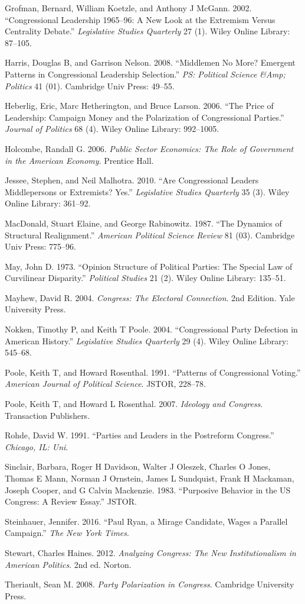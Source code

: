 \documentclass[12pt,twoside]{reedthesis}
\begin{document}
  Grofman, Bernard, William Koetzle, and Anthony J McGann. 2002.
  ``Congressional Leadership 1965--96: A New Look at the Extremism Versus
  Centrality Debate.'' \emph{Legislative Studies Quarterly} 27 (1). Wiley
  Online Library: 87--105.
  
  Harris, Douglas B, and Garrison Nelson. 2008. ``Middlemen No More?
  Emergent Patterns in Congressional Leadership Selection.'' \emph{PS:
  Political Science \&Amp; Politics} 41 (01). Cambridge Univ Press:
  49--55.
  
  Heberlig, Eric, Marc Hetherington, and Bruce Larson. 2006. ``The Price
  of Leadership: Campaign Money and the Polarization of Congressional
  Parties.'' \emph{Journal of Politics} 68 (4). Wiley Online Library:
  992--1005.
  
  Holcombe, Randall G. 2006. \emph{Public Sector Economics: The Role of
  Government in the American Economy}. Prentice Hall.
  
  Jessee, Stephen, and Neil Malhotra. 2010. ``Are Congressional Leaders
  Middlepersons or Extremists? Yes.'' \emph{Legislative Studies Quarterly}
  35 (3). Wiley Online Library: 361--92.
  
  MacDonald, Stuart Elaine, and George Rabinowitz. 1987. ``The Dynamics of
  Structural Realignment.'' \emph{American Political Science Review} 81
  (03). Cambridge Univ Press: 775--96.
  
  May, John D. 1973. ``Opinion Structure of Political Parties: The Special
  Law of Curvilinear Disparity.'' \emph{Political Studies} 21 (2). Wiley
  Online Library: 135--51.
  
  Mayhew, David R. 2004. \emph{Congress: The Electoral Connection}. 2nd
  Edition. Yale University Press.
  
  Nokken, Timothy P, and Keith T Poole. 2004. ``Congressional Party
  Defection in American History.'' \emph{Legislative Studies Quarterly} 29
  (4). Wiley Online Library: 545--68.
  
  Poole, Keith T, and Howard Rosenthal. 1991. ``Patterns of Congressional
  Voting.'' \emph{American Journal of Political Science}. JSTOR, 228--78.
  
  Poole, Keith T, and Howard L Rosenthal. 2007. \emph{Ideology and
  Congress}. Transaction Publishers.
  
  Rohde, David W. 1991. ``Parties and Leaders in the Postreform
  Congress.'' \emph{Chicago, IL: Uni}.
  
  Sinclair, Barbara, Roger H Davidson, Walter J Oleszek, Charles O Jones,
  Thomas E Mann, Norman J Ornstein, James L Sundquist, Frank H Mackaman,
  Joseph Cooper, and G Calvin Mackenzie. 1983. ``Purposive Behavior in the
  US Congress: A Review Essay.'' JSTOR.
  
  Steinhauer, Jennifer. 2016. ``Paul Ryan, a Mirage Candidate, Wages a
  Parallel Campaign.'' \emph{The New York Times}.
  
  Stewart, Charles Haines. 2012. \emph{Analyzing Congress: The New
  Institutionalism in American Politics}. 2nd ed. Norton.
  
  Theriault, Sean M. 2008. \emph{Party Polarization in Congress}.
  Cambridge University Press.


\end{document}
